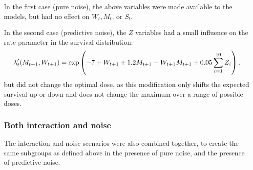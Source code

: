 \documentclass[12pt]{article}
\begin{document}
In the first case (pure noise), the above variables were made available to the models, but had no effect on $W_{t}, M_{t}$, or $S_{t}$.

In the second case (predictive noise), the $Z$ variables had a small influence on the rate parameter in the survival distribution:
\begin{equation}
  \lambda'_{t}(M_{t+1}, W_{t+1}) = \exp\del{-7 + W_{t+1} + 1.2 M_{t+1} + W_{t+1} M_{t+1} + 0.05 \sum_{i = 1}^{10} Z_{i}}.
\end{equation}
but did not change the optimal dose, as this modification only shifts the expected survival up or down and does not change the maximum over a range of possible doses.


\subsubsection{Both interaction and noise} %
\label{ssub:subsubsection_name}

The interaction and noise scenarios were also combined together, to create the same subgroups as defined above in the presence of pure noise, and the presence of predictive noise.





\end{document}
